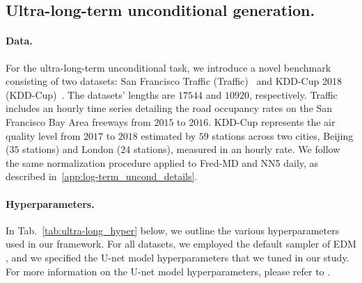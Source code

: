 \documentclass{article}
\begin{document}
\subsection{Ultra-long-term unconditional generation.}
\label{app:subsec:ultra_long_exp_details}

\paragraph{Data.} For the ultra-long-term unconditional task, we introduce a novel benchmark consisting of two datasets: San Francisco Traffic (Traffic)~\cite{lai2018modeling} and KDD-Cup 2018 (KDD-Cup)~\cite{luo2019accuair}. The datasets' lengths are $17544$ and $10920$, respectively. Traffic includes an hourly time series detailing the road occupancy rates on the San Francisco Bay Area freeways from $2015$ to $2016$. KDD-Cup represents the air quality level from $2017$ to $2018$ estimated by $59$ stations across two cities, Beijing ($35$ stations) and London ($24$ stations), measured in an hourly rate. We follow the same normalization procedure applied to Fred-MD and NN5 daily, as described in~\ref{app:log-term_uncond_details}.

\paragraph{Hyperparameters.} In Tab.~\ref{tab:ultra-long_hyper} below, we outline the various hyperparameters used in our framework. For all datasets, we employed the default sampler of EDM \cite{karras2022elucidating}, and we specified the U-net model hyperparameters that we tuned in our study. For more information on the U-net model hyperparameters, please refer to \cite{karras2022elucidating}.
\end{document}
